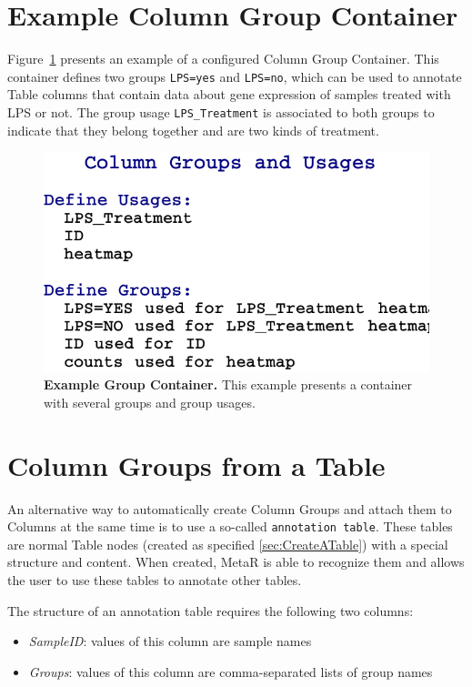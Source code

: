 \section{Example Column Group Container}
Figure~\ref{fig:ExampleGroupContainer} presents an example of a configured Column Group Container. This container defines two groups \texttt{LPS=yes} and \texttt{LPS=no}, which can be used to annotate Table columns that contain data about gene expression of samples treated with LPS or not.  The group usage \texttt{LPS\_Treatment} is associated to both groups to indicate that they belong together and are two kinds of treatment.

\begin{figure}
  \centering
  \includegraphics[width=\figWidthNarrow]{figures/ExampleGroupContainer.pdf}
\caption[Example Group Container.]{\textbf{Example Group Container.} This example presents a container with several groups and group usages.}
\label{fig:ExampleGroupContainer}
\end{figure}

\section{Column Groups from a Table}\label{sec:ColumnGroupsTable}
An alternative way to automatically create Column Groups and attach them to Columns at the same time is to use a so-called \texttt{annotation table}. These tables are normal Table nodes (created as specified \ref{sec:CreateATable}) with a special structure and content. When created, MetaR is able to recognize them and allows the user to use these tables to annotate other tables. 

The structure of an annotation table requires the following two columns: 
\begin{itemize}
\item \textit{SampleID}: values of this column are sample names
\item \textit{Groups}: values of this column are comma-separated lists of group names
\end{itemize}

